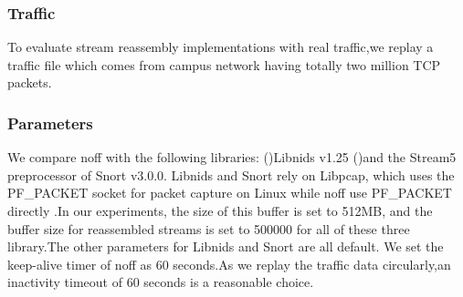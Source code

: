 \documentclass[conference]{IEEEtran}
\begin{document}
\subsubsection{Traffic}
To evaluate stream reassembly implementations with real traffic,we replay a traffic file which comes from campus network having totally two million TCP packets.
\subsubsection{Parameters}
We compare noff with the following libraries: (\uppercase\expandafter{})Libnids v1.25\cite{Libnids}
(\uppercase\expandafter{})and the Stream5 preprocessor of Snort v3.0.0. Libnids and Snort rely on Libpcap\cite{McCanne}, which uses the PF\_PACKET socket for packet capture on Linux while noff use PF\_PACKET directly .In our experiments, the size of this buffer is set to 512MB, and the buffer size for reassembled streams is set to 500000 for all of these three library.The other parameters for Libnids and Snort are all default.  
We set the keep-alive timer of noff as 60 seconds.As we replay the traffic data circularly,an inactivity timeout of 60 seconds is a reasonable choice.
\end{document}
